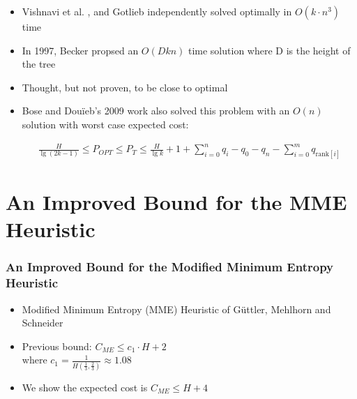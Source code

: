 \documentclass{beamer}
\theoremstyle{plain}
\begin{document}
\begin{frame}

\begin{itemize}

\item Vishnavi et al. \cite{vaishnavi1980optimum}, and Gotlieb  \cite{gotlieb1981optimal} independently solved optimally in $O(k\cdot n^3)$ time

\item In 1997, Becker propsed an $O(Dkn)$ time solution where D is the height of the tree \cite{becker1997construction}

\item Thought, but not proven, to be close to optimal

\item Bose and Dou\"{i}eb's 2009 work also solved this problem with an $O(n)$ solution with worst case expected cost:
\begin{scriptsize}
\begin{align*}
\frac{H}{\lg(2k-1)} \leq P_{OPT} \leq P_T \leq \frac{H}{\lg k} + 1 + \sum_{i=0}^n q_i - q_0 - q_n - \sum_{i=0}^m q_{\text{rank}[i]}
\end{align*}
\end{scriptsize}

\end{itemize}


\end{frame}


\section{An Improved Bound for the MME Heuristic}\label{An Improved Bound for the Modified Minimum Entropy Heuristic}

\begin{frame} \frametitle{An Improved Bound for the Modified Minimum Entropy Heuristic}

\begin{itemize}

\item Modified Minimum Entropy (MME) Heuristic of G{\"u}ttler, Mehlhorn and Schneider \cite{guttler1980binary}

\item Previous bound: $C_{ME} \leq c_1\cdot H+2$ \\ where $c_1=\frac{1}{H(\frac{1}{3}, \frac{2}{3})} \approx 1.08$ 

\item We show the expected cost is $C_{ME} \leq H+4$

\end{itemize}

\end{frame}
\end{document}

